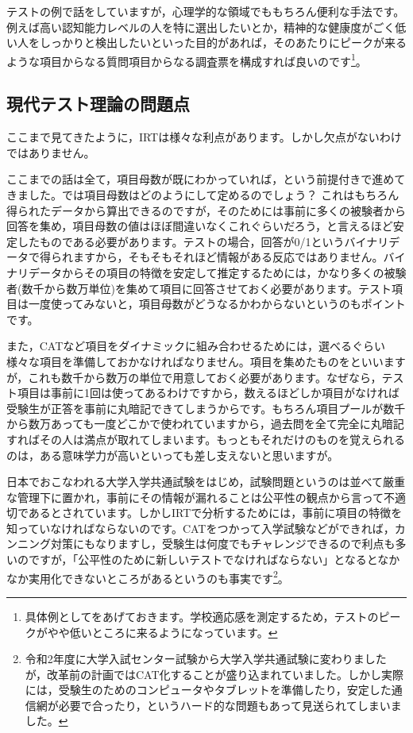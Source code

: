 \documentclass{ltjsbook}
\begin{document}
テストの例で話をしていますが，心理学的な領域でももちろん便利な手法です。例えば高い認知能力レベルの人を特に選出したいとか，精神的な健康度がごく低い人をしっかりと検出したいといった目的があれば，そのあたりにピークが来るような項目からなる質問項目からなる調査票を構成すれば良いのです\footnote{具体例として\citet{kosugi120005596041}をあげておきます。学校適応感を測定するため，テストのピークがやや低いところに来るようになっています。}。


\subsection{現代テスト理論の問題点}
ここまで見てきたように，IRTは様々な利点があります。しかし欠点がないわけではありません。

ここまでの話は全て，項目母数が既にわかっていれば，という前提付きで進めてきました。では項目母数はどのようにして定めるのでしょう？ これはもちろん得られたデータから算出できるのですが，そのためには事前に多くの被験者から回答を集め，項目母数の値はほぼ間違いなくこれぐらいだろう，と言えるほど安定したものである必要があります。テストの場合，回答が0/1というバイナリデータで得られますから，そもそもそれほど情報がある反応ではありません。バイナリデータからその項目の特徴を安定して推定するためには，かなり多くの被験者(数千から数万単位)を集めて項目に回答させておく必要があります。テスト項目は一度使ってみないと，項目母数がどうなるかわからないというのもポイントです。

また，CATなど項目をダイナミックに組み合わせるためには，選べるぐらい様々な項目を準備しておかなければなりません。項目を集めたものをといいますが，これも数千から数万の単位で用意しておく必要があります。なぜなら，テスト項目は事前に1回は使ってあるわけですから，数えるほどしか項目がなければ受験生が正答を事前に丸暗記できてしまうからです。もちろん項目プールが数千から数万あっても一度どこかで使われていますから，過去問を全て完全に丸暗記すればその人は満点が取れてしまいます。もっともそれだけのものを覚えられるのは，ある意味学力が高いといっても差し支えないと思いますが。

日本でおこなわれる大学入学共通試験をはじめ，試験問題というのは並べて厳重な管理下に置かれ，事前にその情報が漏れることは公平性の観点から言って不適切であるとされています。しかしIRTで分析するためには，事前に項目の特徴を知っていなければならないのです。CATをつかって入学試験などができれば，カンニング対策にもなりますし，受験生は何度でもチャレンジできるので利点も多いのですが，「公平性のために新しいテストでなければならない」となるとなかなか実用化できないところがあるというのも事実です\footnote{令和2年度に大学入試センター試験から大学入学共通試験に変わりましたが，改革前の計画ではCAT化することが盛り込まれていました。しかし実際には，受験生のためのコンピュータやタブレットを準備したり，安定した通信網が必要で合ったり，というハード的な問題もあって見送られてしまいました。}。
\end{document}
